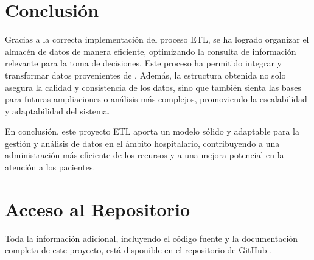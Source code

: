 \documentclass{article}
\begin{document}
	\section{Conclusión}
	\label{sec:conclusion}
	
	Gracias a la correcta implementación del proceso ETL, se ha logrado organizar el almacén de datos de manera eficiente, optimizando la consulta de información relevante para la toma de decisiones. Este proceso ha permitido integrar y transformar datos provenientes de \cite{eicu_crd}. Además, la estructura obtenida no solo asegura la calidad y consistencia de los datos, sino que también sienta las bases para futuras ampliaciones o análisis más complejos, promoviendo la escalabilidad y adaptabilidad del sistema.
	
	En conclusión, este proyecto ETL aporta un modelo sólido y adaptable para la gestión y análisis de datos en el ámbito hospitalario, contribuyendo a una administración más eficiente de los recursos y a una mejora potencial en la atención a los pacientes.
	
	\newpage
	\section{Acceso al Repositorio}
	
	Toda la información adicional, incluyendo el código fuente y la documentación completa de este proyecto, está disponible en el repositorio de GitHub \cite{silva2024github}.
	
	
\end{document}

